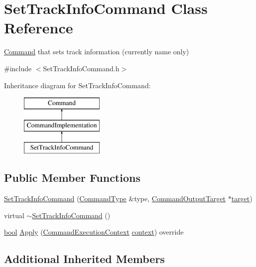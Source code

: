 \hypertarget{class_set_track_info_command}{}\section{Set\+Track\+Info\+Command Class Reference}
\label{class_set_track_info_command}


\hyperlink{class_command}{Command} that sets track information (currently name only)  




{\ttfamily \#include $<$Set\+Track\+Info\+Command.\+h$>$}

Inheritance diagram for Set\+Track\+Info\+Command\+:\begin{figure}[H]
\begin{center}
\leavevmode
\includegraphics[height=3.000000cm]{class_set_track_info_command}
\end{center}
\end{figure}
\subsection*{Public Member Functions}
\begin{DoxyCompactItemize}
\item 
\hyperlink{class_set_track_info_command_af3e6b643615d761025bd75a81dcab7a4}{Set\+Track\+Info\+Command} (\hyperlink{class_command_type}{Command\+Type} \&type, \hyperlink{class_command_output_target}{Command\+Output\+Target} $\ast$\hyperlink{lib_2expat_8h_a15a257516a87decb971420e718853137}{target})
\item 
virtual \hyperlink{class_set_track_info_command_a5122d2e29f526472c49b079b3b1a130f}{$\sim$\+Set\+Track\+Info\+Command} ()
\item 
\hyperlink{mac_2config_2i386_2lib-src_2libsoxr_2soxr-config_8h_abb452686968e48b67397da5f97445f5b}{bool} \hyperlink{class_set_track_info_command_a2b57b0bf7fffc2d6ee74539008b2f502}{Apply} (\hyperlink{class_command_execution_context}{Command\+Execution\+Context} \hyperlink{structcontext}{context}) override
\end{DoxyCompactItemize}
\subsection*{Additional Inherited Members}


